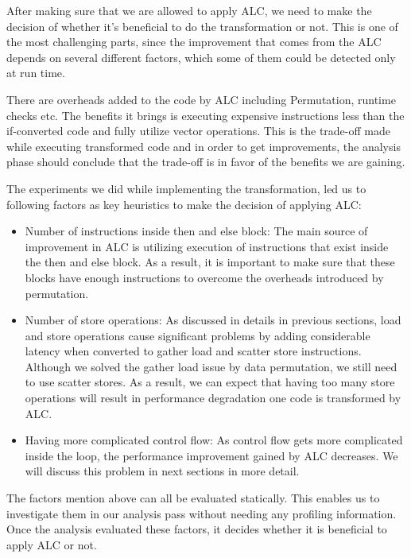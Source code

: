 After making sure that we are allowed to apply ALC, we need to make the decision of whether it's beneficial to do the transformation or not. This is one of the most challenging parts, since the improvement that comes from the ALC depends on several different factors, which some of them could be detected only at run time.

There are overheads added to the code by ALC including Permutation, runtime checks etc. The benefits it brings is executing expensive instructions less than the if-converted code and fully utilize vector operations. This is the trade-off made while executing transformed code and in order to get improvements, the analysis phase should conclude that the trade-off is in favor of the benefits we are gaining.

The experiments we did while implementing the transformation, led us to following factors as key heuristics to make the decision of applying ALC:

\begin{itemize}
\item Number of instructions inside then and else block: The main source of improvement in ALC is utilizing execution of instructions that exist inside the then and else block. As a result, it is important to make sure that these blocks have enough instructions to overcome the overheads introduced by permutation.

\item Number of store operations: As discussed in details in previous sections, load and store operations cause significant problems by adding 
considerable latency when converted to gather load and scatter store instructions. Although we solved the gather load issue by data permutation, we still need to use scatter stores. As a result, we can expect that having too many store operations will result in performance degradation one code is transformed by ALC.

\item Having more complicated control flow: As control flow gets more complicated inside the loop, the performance improvement gained by ALC decreases. We will discuss this problem in next sections in more detail.
\end{itemize}

The factors mention above can all be evaluated statically. This enables us to investigate them in our analysis pass without needing any profiling information. Once the analysis evaluated these factors, it decides whether it is beneficial to apply ALC or not.

\fi